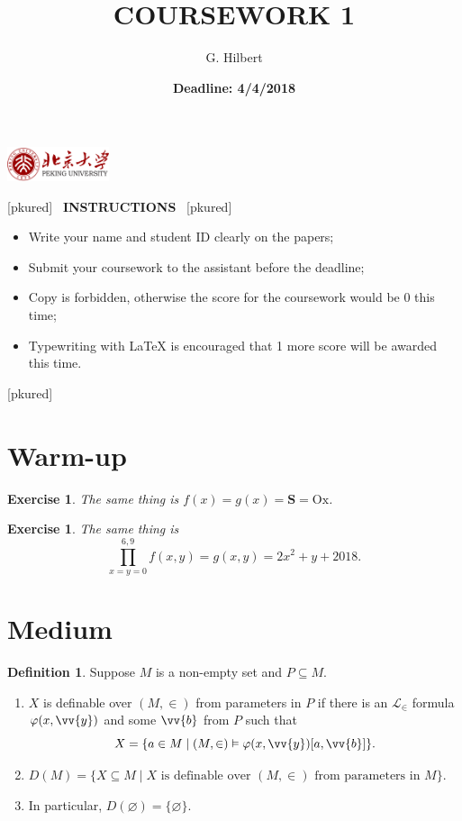 \documentclass[12pt]{article}
\title{\bfseries COURSEWORK 1%
}
\author{G. Hilbert%
}
\date{\bf Deadline: 4/4/2018}
\newtheorem{exercise}[theorem]{Exercise}
\theoremstyle{definition}
\newtheorem{definition}[theorem]{Definition}
\begin{document}
\noindent\includegraphics[height=1cm]{pku.png}\hfill{\raisebox{.38\baselineskip}{\textcolor{pkured}{\bfseries\scshape Mathematical Logic in 2018 Fall}}}
\vskip -22pt
{\let\newpage\relax\maketitle}

\thispagestyle{fancy}
\cfoot{\small\thepage$/$\pageref{CC001}}

\pagestyle{fancy}

\noindent\xrfill{1pt}[pkured]
~\textcolor{pkured}{\bfseries INSTRUCTIONS}~
\xrfill{1pt}[pkured]  
\textcolor{pkured}{
\begin{itemize}
\item Write your name and student ID clearly on the papers;
\item Submit your coursework to the assistant before the deadline;
\item Copy is forbidden, otherwise the score for the coursework would be 0 this time;
\item Typewriting with \LaTeX{} is encouraged that 1 more score will be awarded this time.
\end{itemize}
}
\noindent\xrfill{1pt}[pkured] 
\par\vskip 12pt 

\section*{Warm-up}
\begin{exercise}
The	same thing is $f(x)=g(x)=\mathbf{S}=\mathrm{Ox}$.
\end{exercise}

\begin{exercise}
	The	same thing is 
	\[\prod_{x=y=0}^{6,9}f(x,y)=g(x,y)=2x^2+y+2018.\]
\end{exercise}

\section*{Medium}
\begin{definition}
	Suppose $M$ is a non-empty set and $P\subseteq M$.
	\begin{enumerate}
		\item $X$ is definable over $(M,\in)$ from parameters in $P$ if there is an $\mathscr{L}_\in$ formula $\varphi(x,\vv{y})$ and some $\vv{b}$ from $P$ such that
		\[
		X=\{a\in M\mid (M,\in)\vDash \varphi(x,\vv{y})[a,\vv{b}]\}.
		\]
		\item $D(M)=\{X\subseteq M\mid X\text{ is definable over }(M,\in)\text{ from parameters in }M\}$.
		\item In particular, $D(\varnothing)=\{\varnothing\}$.
	\end{enumerate}
\end{definition}
\end{document}
